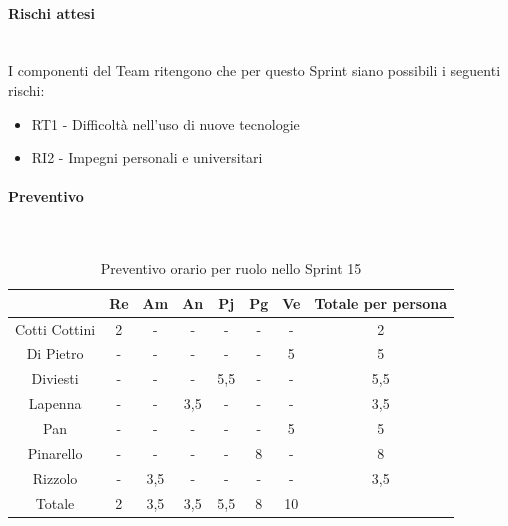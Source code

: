 \documentclass{article}
\begin{document}
                \paragraph{Rischi attesi}\mbox{}\\
                    I componenti del Team ritengono che per questo Sprint siano possibili i seguenti rischi:
                    \begin{itemize}
                        \item RT1 - Difficoltà nell’uso di nuove tecnologie
                        \item RI2 - Impegni personali e universitari
                    \end{itemize}


                \paragraph{Preventivo}\mbox{}\\
                \begin{table}[H]
                    \centering
                    \begin{tabular}{|c|c|c|c|c|c|c|c|}
                    \hline
                                  & Re  & Am  & An  & Pj  & Pg  & Ve  & Totale per persona \\ \hline
                    Cotti Cottini & 2   & -   & -   & -   & -   & -   & 2                  \\ \hline
                    Di Pietro     & -   & -   & -   & -   & -   & 5   & 5                  \\ \hline
                    Diviesti      & -   & -   & -   & 5,5 & -   & -   & 5,5                \\ \hline
                    Lapenna       & -   & -   & 3,5 & -   & -   & -   & 3,5                \\ \hline
                    Pan           & -   & -   & -   & -   & -   & 5   & 5                  \\ \hline
                    Pinarello     & -   & -   & -   & -   & 8  & -   & 8                 \\ \hline
                    Rizzolo       & -   & 3,5 & -   & -   & -   & -   & 3,5                \\ \hline
                    Totale        & 2   & 3,5 & 3,5 & 5,5 & 8  & 10  &                    \\ \hline
                    \end{tabular}
                    \caption{Preventivo orario per ruolo nello Sprint 15}
                \end{table}
\end{document}
